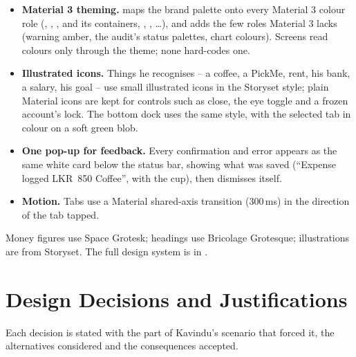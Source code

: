 \documentclass[11pt,a4paper]{article}
\newcommand{\lkr}[1]{LKR~#1}
\begin{document}
\begin{itemize}
  \item \textbf{Material 3 theming.}  maps the brand palette onto every Material 3 colour role (, , ,  and its containers, , , \ldots), and  adds the few roles Material 3 lacks (warning amber, the audit's status palettes, chart colours). Screens read colours only through the theme; none hard-codes one.
  \item \textbf{Illustrated icons.} Things he recognises -- a coffee, a PickMe, rent, his bank, a salary, his goal -- use small illustrated icons in the Storyset style; plain Material icons are kept for controls such as close, the eye toggle and a frozen account's lock. The bottom dock uses the same style, with the selected tab in colour on a soft green blob.
  \item \textbf{One pop-up for feedback.} Every confirmation and error appears as the same white card below the status bar, showing what was saved (``Expense logged \textperiodcentered{} \lkr{850} \textperiodcentered{} Coffee'', with the cup), then dismisses itself.
  \item \textbf{Motion.} Tabs use a Material shared-axis transition (300\,ms) in the direction of the tab tapped.
\end{itemize}
Money figures use Space Grotesk; headings use Bricolage Grotesque; illustrations are from Storyset. The full design system is in .

\section{Design Decisions and Justifications}
\label{sec:decisions}
Each decision is stated with the part of Kavindu's scenario that forced it, the alternatives considered and the consequences accepted.

\newcommand{\decision}[5]{%
\subsection*{DD-#1\quad #2}
\addcontentsline{toc}{subsection}{DD-#1\enspace #2}
\begin{tabularx}{\textwidth}{|>{\raggedright\arraybackslash}p{2.6cm}|L|}
\textbf{Context} & #3\\
\textbf{Alternatives} & #4\\
\textbf{Consequences} & #5\\
\end{tabularx}}
\end{document}
